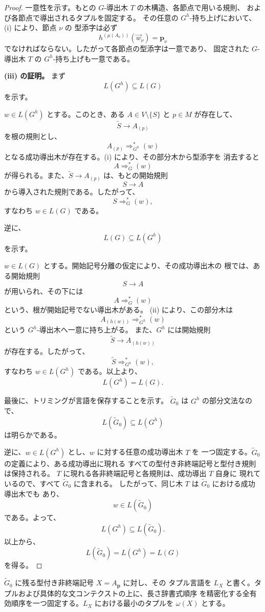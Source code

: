 \documentclass[11pt,a4paper]{ltjsarticle}
\theoremstyle{remark}
\newcommand{\tuple}[1]{\vec{#1}}
\begin{document}
\begin{proof}
一意性を示す。もとの \(G\)-導出木 \(T\) の木構造、各節点で用いる規則、
および各節点で導出されるタプルを固定する。
その任意の \(G^h\)-持ち上げにおいて、(i) により、節点 \(\nu\) の
型添字は必ず
\[
  h^{(\mu(A_\nu))}(\tuple w_\nu)
  =
  \mathbf p_\nu
\]
でなければならない。したがって各節点の型添字は一意であり、
固定された \(G\)-導出木 \(T\) の \(G^h\)-持ち上げも一意である。

\medskip
\noindent
\textbf{(iii) の証明。}
まず
\[
  L(G^h)\subseteq L(G)
\]
を示す。

\(w\in L(G^h)\) とする。このとき、ある \(A\in V\setminus\{S\}\) と
\(p\in M\) が存在して、
\[
  \widetilde S\to A_{(p)}
\]
を根の規則とし、
\[
  A_{(p)}\Rightarrow_{G^h}^*(w)
\]
となる成功導出木が存在する。(i) により、その部分木から型添字を
消去すると
\[
  A\Rightarrow_G^*(w)
\]
が得られる。また、\(\widetilde S\to A_{(p)}\) は、もとの開始規則
\[
  S\to A
\]
から導入された規則である。したがって、
\[
  S\Rightarrow_G^*(w),
\]
すなわち \(w\in L(G)\) である。

逆に、
\[
  L(G)\subseteq L(G^h)
\]
を示す。

\(w\in L(G)\) とする。開始記号分離の仮定により、その成功導出木の
根では、ある開始規則
\[
  S\to A
\]
が用いられ、その下には
\[
  A\Rightarrow_G^*(w)
\]
という、根が開始記号でない導出木がある。
(ii) により、この部分木は
\[
  A_{(h(w))}\Rightarrow_{G^h}^*(w)
\]
という \(G^h\)-導出木へ一意に持ち上がる。
また、\(G^h\) には開始規則
\[
  \widetilde S\to A_{(h(w))}
\]
が存在する。したがって、
\[
  \widetilde S\Rightarrow_{G^h}^*(w),
\]
すなわち \(w\in L(G^h)\) である。以上より、
\[
  L(G^h)=L(G).
\]

最後に、トリミングが言語を保存することを示す。
\(\widetilde G_0\) は \(G^h\) の部分文法なので、
\[
  L(\widetilde G_0)\subseteq L(G^h)
\]
は明らかである。

逆に、\(w\in L(G^h)\) とし、\(w\) に対する任意の成功導出木 \(T\) を
一つ固定する。\(\widetilde G_0\) の定義により、ある成功導出に現れる
すべての型付き非終端記号と型付き規則は保持される。
\(T\) に現れる各非終端記号と各規則は、成功導出 \(T\) 自身に
現れているので、すべて \(\widetilde G_0\) に含まれる。
したがって、同じ木 \(T\) は \(\widetilde G_0\) における成功導出木でも
あり、
\[
  w\in L(\widetilde G_0)
\]
である。よって、
\[
  L(G^h)\subseteq L(\widetilde G_0).
\]
以上から、
\[
  L(\widetilde G_0)=L(G^h)=L(G)
\]
を得る。
\end{proof}
\(\widetilde G_0\) に残る型付き非終端記号 \(X=A_{\mathbf p}\) に対し、その
タプル言語を \(L_X\) と書く。タプルおよび具体的な文コンテクストの上に、長さ辞書式順序
を精密化する全有効順序を一つ固定する。\(L_X\) における最小のタプルを
\(\omega(X)\) とする。
\end{document}
